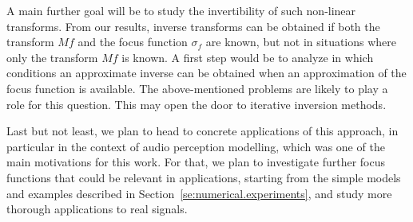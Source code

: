 \smallskip
A main further goal will be to study the invertibility of such non-linear transforms. From our results, inverse transforms can be obtained if both the transform $Mf$ and the focus function $\sigma_f$ are known, but not in situations where only the transform $Mf$ is known. A first step would be to analyze in which conditions an approximate inverse can be obtained when an approximation of the focus function is available. The above-mentioned problems are likely to play a role for this question. This may open the door to iterative inversion methods.

\smallskip
Last but not least, we plan to head to concrete applications of this approach, in particular in the context of audio perception modelling, which was one of the main motivations for this work. For that, we plan to investigate further focus functions that could be relevant in applications, starting from the simple models and examples described in Section~\ref{se:numerical.experiments}, and study more thorough applications to real signals.
